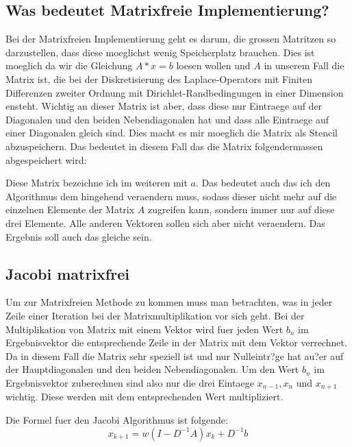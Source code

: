 \documentclass[a4paper, 11pt]{article}
\begin{document}
\subsection{Was bedeutet Matrixfreie Implementierung?}
Bei der Matrixfreien Implementierung geht es darum, die grossen Matritzen so darzustellen, dass diese moeglichst wenig Speicherplatz brauchen. Dies ist moeglich da wir die Gleichung \(A*x=b\) loesen wollen und \(A\) 
in unserem Fall die Matrix ist, die bei der Diskretisierung des Laplace-Operators mit Finiten Differenzen zweiter Ordnung mit Dirichlet-Randbedingungen in einer Dimension ensteht. Wichtig an dieser Matrix ist aber, 
dass diese nur Eintraege auf der Diagonalen und den beiden Nebendiagonalen hat und dass alle Eintraege auf einer Diagonalen gleich sind.
Dies macht es mir moeglich die Matrix als Stencil abzuspeichern. Das bedeutet in diesem Fall das die Matrix folgendermassen abgespeichert wird:


Diese Matrix bezeichne ich im weiteren mit \(a\).
Das bedeutet auch das ich den Algorithmus dem hingehend veraendern muss, sodass dieser nicht mehr auf die einzelnen Elemente der Matrix \(A\) zugreifen kann, sondern immer nur auf diese drei Elemente.
Alle anderen Vektoren sollen sich aber nicht veraendern. Das Ergebnis soll auch das gleiche sein.

\newpage

\subsection{Jacobi matrixfrei}
Um zur Matrixfreien Methode zu kommen muss man betrachten, was in jeder Zeile einer Iteration bei der Matrixmultiplikation vor sich geht. Bei der Multiplikation von Matrix mit einem Vektor wird fuer jeden Wert \(b_{n}\) 
im Ergebnisvektor die entsprechende Zeile in der Matrix mit dem Vektor verrechnet. Da in diesem Fall die Matrix sehr speziell ist und nur Nulleintr?ge hat au?er auf der Hauptdiagonalen und den beiden Nebendiagonalen. 
Um den Wert $b_{n}$ im Ergebnisvektor zuberechnen sind also nur die drei Eintaege \(x_{n-1}, x_{n}\) und \(x_{n+1}\)wichtig. Diese werden mit dem entsprechenden Wert multipliziert.

Die Formel fuer den Jacobi Algorithmus ist folgende: 
\begin{equation}
  x_{k+1}=w(I-D^{-1}A)x_{k}+D^{-1}b
\end{equation}
\end{document}
